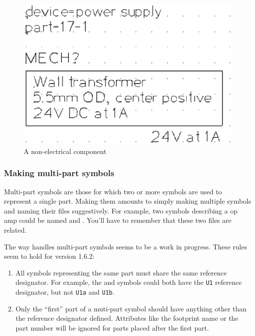 \begin{figure}[ht]
    \begin{center}
        \includegraphics[clip,scale=0.4]{wall_xformer_24v_1a.ps}
        \caption{A non-electrical component\label{non_electric}}
    \end{center} 
\end{figure}


\clearpage
\subsubsection{Making multi-part symbols}
Multi-part symbols are those for which two or more symbols are used to represent a single part.  Making them amounts to simply making multiple symbols and naming their files suggestively.  For example, two symbols describing a  op amp could be named  and .  You'll have to remember that these two files are related.  

The way  handles multi-part symbols seems to be a work in progress.  These rules seem to hold for  version 1.6.2:
\begin{enumerate}
    \item All symbols representing the same part must share the same reference designator.  For example, the  and  symbols could both have the \texttt{U1} reference designator, but not \texttt{U1a} and \texttt{U1b}.
    \item Only the ``first'' part of a muti-part symbol should have anything other than the reference designator defined.  Attributes like the footprint name or the part number will be ignored for parts placed after the first part.
\end{enumerate}

